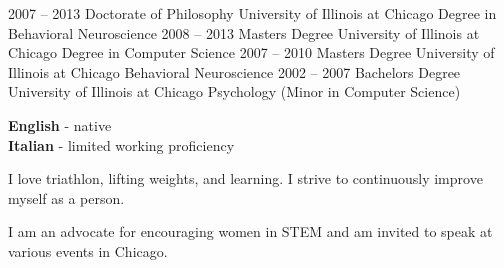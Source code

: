 \documentclass[9pt]{developercv} %
\begin{document}


\begin{entrylist}
	\entry
		{2007 -- 2013}
		{Doctorate of Philosophy}
		{University of Illinois at Chicago}
		{Degree in Behavioral Neuroscience}
	\entry
		{2008 -- 2013}
		{Masters Degree}
		{University of Illinois at Chicago}
		{Degree in Computer Science}
	\entry
		{2007 -- 2010}
		{Masters Degree}
		{University of Illinois at Chicago}
		{Behavioral Neuroscience}
	\entry
		{2002 -- 2007}
		{Bachelors Degree}
		{University of Illinois at Chicago}
		{Psychology (Minor in Computer Science)}
\end{entrylist}


\begin{minipage}[t]{0.3\textwidth}
	\vspace{-\baselineskip} %

	
	\textbf{English} - native\\
	\textbf{Italian} - limited working proficiency
\end{minipage}
\hfill
\begin{minipage}[t]{0.3\textwidth}
	\vspace{-\baselineskip} %
	
	
	I love triathlon, lifting weights, and learning. I strive to continuously improve myself as a person.
	\end{minipage}
\hfill
\begin{minipage}[t]{0.3\textwidth}
	\vspace{-\baselineskip} %
	
	
	I am an advocate for encouraging women in STEM and am invited to speak at various events in Chicago.
\end{minipage}

\end{document}
